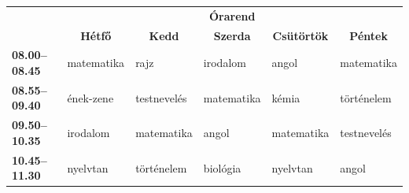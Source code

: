 \documentclass{thesis-ekf}
\theoremstyle{definition}
\theoremstyle{remark}
\begin{document}
\begin{table}[h]
    \centering
    \footnotesize
    \begin{tabular}{|>{\bfseries}l|l|l|l|l|l|}
        \cline{2-6}
        \multicolumn{1}{c|}{} & \multicolumn{5}{c|}{\textbf{Órarend}}\\
        \cline{2-6}
        \multicolumn{1}{c|}{} &
        \multicolumn{1}{c|}{\textbf{Hétfő}} &
        \multicolumn{1}{c|}{\textbf{Kedd}} &
        \multicolumn{1}{c|}{\textbf{Szerda}} &
        \multicolumn{1}{c|}{\textbf{Csütörtök}} &
        \multicolumn{1}{c|}{\textbf{Péntek}} \\
        \hline
        08.00--08.45 &
        matematika &
        rajz &
        irodalom &
        angol &
        matematika\\
        \hline
        08.55--09.40 &
        ének-zene &
        testnevelés &
        matematika &
        kémia &
        történelem\\
        \hline
        09.50--10.35 &
        irodalom &
        matematika &
        angol &
        matematika &
        testnevelés\\
        \hline
        10.45--11.30 &
        nyelvtan &
        történelem &
        biológia &
        nyelvtan &
        angol\\
        \hline
    \end{tabular}
\end{table}

\begin{thebibliography}{2}
\end{thebibliography}


\end{document}
